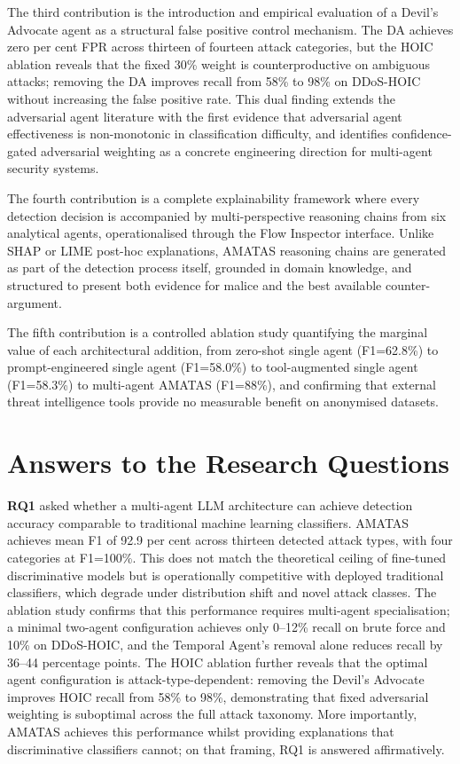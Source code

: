 The third contribution is the introduction and empirical evaluation of a Devil's Advocate agent as a structural false positive control mechanism. The DA achieves zero per cent FPR across thirteen of fourteen attack categories, but the HOIC ablation reveals that the fixed 30\% weight is counterproductive on ambiguous attacks; removing the DA improves recall from 58\% to 98\% on DDoS-HOIC without increasing the false positive rate. This dual finding extends the adversarial agent literature \autocite{Yin2024, Du2023, Chan2023} with the first evidence that adversarial agent effectiveness is non-monotonic in classification difficulty, and identifies confidence-gated adversarial weighting as a concrete engineering direction for multi-agent security systems.

The fourth contribution is a complete explainability framework where every detection decision is accompanied by multi-perspective reasoning chains from six analytical agents, operationalised through the Flow Inspector interface. Unlike SHAP or LIME post-hoc explanations, AMATAS reasoning chains are generated as part of the detection process itself, grounded in domain knowledge, and structured to present both evidence for malice and the best available counter-argument.

The fifth contribution is a controlled ablation study quantifying the marginal value of each architectural addition, from zero-shot single agent (F1=62.8\%) to prompt-engineered single agent (F1=58.0\%) to tool-augmented single agent (F1=58.3\%) to multi-agent AMATAS (F1=88\%), and confirming that external threat intelligence tools provide no measurable benefit on anonymised datasets.

\section{Answers to the Research Questions}

\textbf{RQ1} asked whether a multi-agent LLM architecture can achieve detection accuracy comparable to traditional machine learning classifiers. AMATAS achieves mean F1 of 92.9 per cent across thirteen detected attack types, with four categories at F1=100\%. This does not match the theoretical ceiling of fine-tuned discriminative models but is operationally competitive with deployed traditional classifiers, which degrade under distribution shift and novel attack classes. The ablation study confirms that this performance requires multi-agent specialisation; a minimal two-agent configuration achieves only 0--12\% recall on brute force and 10\% on DDoS-HOIC, and the Temporal Agent's removal alone reduces recall by 36--44 percentage points. The HOIC ablation further reveals that the optimal agent configuration is attack-type-dependent: removing the Devil's Advocate improves HOIC recall from 58\% to 98\%, demonstrating that fixed adversarial weighting is suboptimal across the full attack taxonomy. More importantly, AMATAS achieves this performance whilst providing explanations that discriminative classifiers cannot; on that framing, RQ1 is answered affirmatively.

